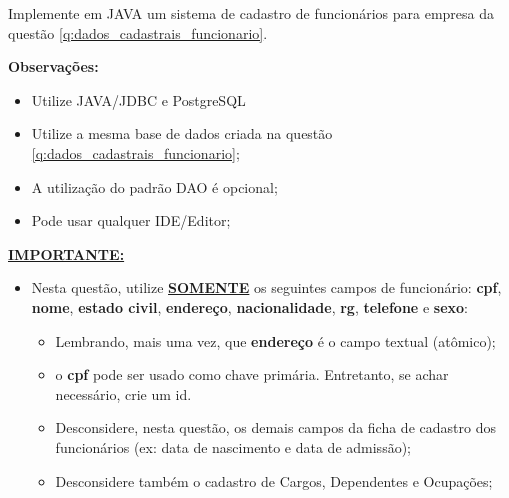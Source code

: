\documentclass[12pt]{exam}
\begin{document}
\begin{questions}
\question[1.0] Implemente em JAVA um sistema de cadastro de funcionários para empresa da questão \ref{q:dados_cadastrais_funcionario}. 


\textbf{Observações:}

\begin{itemize}
    \item Utilize JAVA/JDBC e PostgreSQL
    \item Utilize a mesma base de dados criada na questão \ref{q:dados_cadastrais_funcionario};
    \item A utilização do padrão DAO é opcional;
    \item Pode usar qualquer IDE/Editor;
\end{itemize}


     \textbf{\underline{IMPORTANTE:}} 
     
    \begin{itemize} 
     \item Nesta questão, utilize \textbf{\underline{SOMENTE}} os seguintes campos de funcionário:
        \textbf{cpf},
        \textbf{nome},
        \textbf{estado civil},
        \textbf{endereço},
        \textbf{nacionalidade},
        \textbf{rg},
        \textbf{telefone} e 
        \textbf{sexo}: 
        \begin{itemize}
            \item Lembrando, mais uma vez, que \textbf{endereço} é o campo textual (atômico);
            \item o \textbf{cpf} pode ser usado como chave primária. Entretanto, se achar necessário, crie um id. 
            \item Desconsidere, nesta questão, os demais campos da ficha de cadastro dos funcionários (ex: data de nascimento e data de admissão);
            \item Desconsidere também o cadastro de Cargos, Dependentes e Ocupações;
        \end{itemize}
\end{itemize}



\end{questions}
\end{document}
